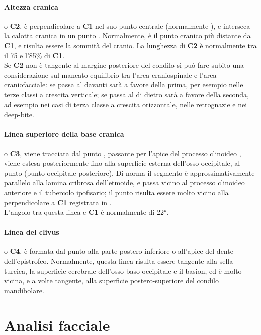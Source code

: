 \paragraph{Altezza cranica} o \textbf{C2}, è perpendicolare a \textbf{C1} nel suo punto centrale (normalmente ), e interseca la calotta cranica in un punto . Normalmente,  è il punto cranico più distante da \textbf{C1}, e  risulta essere la sommità del cranio. La lunghezza di \textbf{C2} è normalmente tra il 75 e l'85\% di \textbf{C1}.\\
Se \textbf{C2} non è tangente al margine posteriore del condilo si può fare subito una considerazione sul mancato equilibrio tra l'area craniospinale e l'area craniofacciale: se passa al davanti sarà a favore della prima, per esempio nelle terze classi a crescita verticale; se passa al di dietro sarà a favore della seconda, ad esempio nei casi di terza classe a crescita orizzontale, nelle retrognazie e nei deep-bite.

\paragraph{Linea superiore della base cranica} o \textbf{C3}, viene tracciata dal punto , passante per l'apice del processo clinoideo , viene estesa posteriormente fino alla superficie esterna dell'osso occipitale, al punto  (punto occipitale posteriore). Di norma il segmento  è approssimativamente parallelo alla lamina cribrosa dell'etmoide, e passa vicino al processo clinoideo anteriore e il tubercolo ipofisario; il punto  risulta essere molto vicino alla perpendicolare a \textbf{C1} registrata in .\\
L'angolo tra questa linea e \textbf{C1} è normalmente di 22°.

\paragraph{Linea del clivus} o \textbf{C4}, è formata dal punto  alla parte postero-inferiore o all'apice del dente dell'epistrofeo. Normalmente, questa linea risulta essere tangente alla sella turcica, la superficie cerebrale dell'osso baso-occipitale e il basion, ed è molto vicina, e a volte tangente, alla superficie postero-superiore del condilo mandibolare.

\section{Analisi facciale}
